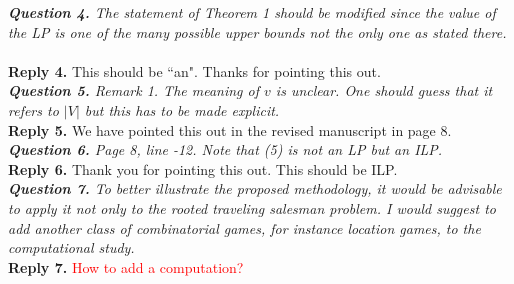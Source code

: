 \documentclass[11pt]{article}
\begin{document}
%
%
%
\noindent \textit{\textbf{Question 4.}
The statement of Theorem 1 should be modified since the value of the
LP is one of the many possible upper bounds not the only one as stated
there.
}
~\\[2mm]
\noindent \textbf{Reply 4.}
This should be ``an". Thanks for pointing this out.
~\\[4mm]
%
%
%
\noindent \textit{\textbf{Question 5.}
Remark 1. The meaning of $v$ is unclear. One should guess that it refers
to $|V|$ but this has to be made explicit.
}
\\[2mm]
\noindent \textbf{Reply 5.}
We have pointed this out in the revised manuscript in page 8.
\\[4mm]
%
%
%
\noindent \textit{\textbf{Question 6.}
Page 8, line -12. Note that (5) is not an LP but an ILP.
}
\\[2mm]
\noindent \textbf{Reply 6.}
Thank you for pointing this out.
This should be ILP.
\\[4mm]
%
%
%
\noindent \textit{\textbf{Question 7.}
To better illustrate the proposed methodology, it would be advisable
to apply it not only to the rooted traveling salesman problem. I would
suggest to add another class of combinatorial games, for instance location games, to the computational study.}
\\[2mm]
\noindent \textbf{Reply 7.}
\textcolor{red}{How to add a computation?}
\\[4mm]
%
%
\end{document}
